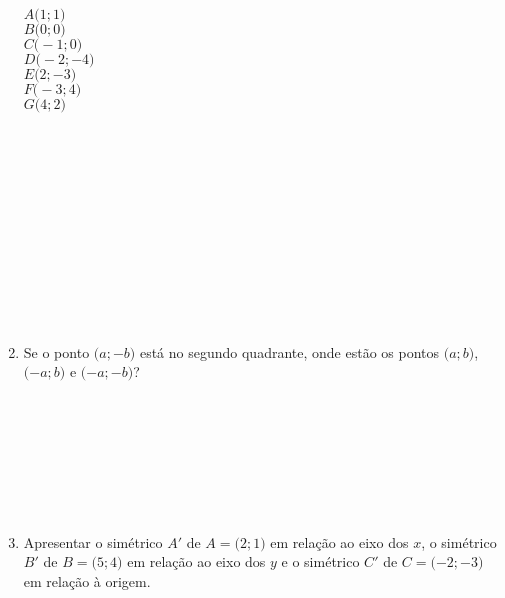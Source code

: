 \documentclass[a4paper,14pt]{article}
\begin{document}
\begin{multicols}{2}
\begin{enumerate}
    	    $A\big(1; 1\big)$\\
    	    $B\big(0; 0\big)$\\
    	    $C\big(-1; 0\big)$\\
    	    $D\big(-2; -4\big)$\\
    	    $E\big(2; -3\big)$\\
    	    $F\big(-3; 4\big)$\\
    	    $G\big(4; 2\big)$\\\\\\\\\\\\\\\\\\\\\\\\
    	    \item Se o ponto $\big(a; -b\big)$ está no segundo quadrante, onde estão os pontos $\big(a; b\big)$, $\big({-a}; b\big)$ e $\big({-a}; {-b}\big)$? \\\\\\\\\\\\\\\\
    	    \item Apresentar o simétrico $A'$ de $A = \big(2; 1\big)$ em relação ao eixo dos $x$, o simétrico $B'$ de $B = \big(5; 4\big)$ em relação ao eixo dos $y$ e o simétrico $C'$ de $C = \big({-2}; {-3}\big)$ em relação à origem. \\\\\\\\\\\\\\\\\\\\\\\\\\\\\\\\\\\\\\\\\\\\\\\\\\\\

\end{enumerate}
\end{multicols}
\end{document}

